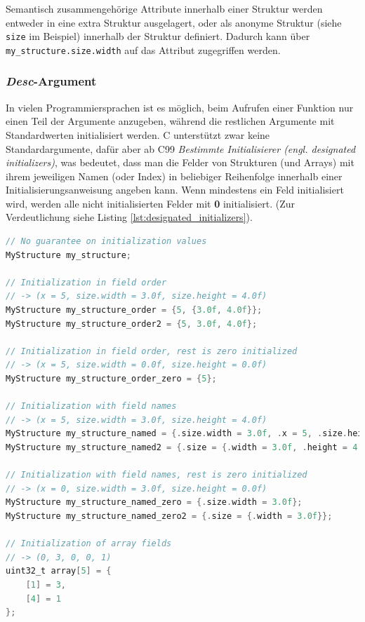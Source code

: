 \documentclass[oneside]{ausarbeitung}
\begin{document}
Semantisch zusammengehörige Attribute innerhalb einer Struktur werden entweder in eine extra Struktur ausgelagert, oder als anonyme Struktur (siehe \texttt{size} im Beispiel) innerhalb der Struktur definiert. Dadurch kann über \texttt{my\_structure.size.width} auf das Attribut zugegriffen werden.

\subsubsection{\textit{Desc}-Argument}
In vielen Programmiersprachen ist es möglich, beim Aufrufen einer Funktion nur einen Teil der Argumente anzugeben, während die restlichen Argumente mit Standardwerten initialisiert werden. C unterstützt zwar keine Standardargumente, dafür aber ab C99 \textit{Bestimmte Initialisierer (engl. designated initializers)}, was bedeutet, dass man die Felder von Strukturen (und Arrays) mit ihrem jeweiligen Namen (oder Index) in beliebiger Reihenfolge innerhalb einer Initialisierungsanweisung angeben kann. Wenn mindestens ein Feld initialisiert wird, werden alle nicht initialisierten Felder mit \textbf{0} initialisiert. (Zur Verdeutlichung siehe Listing \ref{lst:designated_initializers}). 

\begin{minipage}{\textwidth}
\begin{lstlisting}[language=C, label={lst:designated_initializers}, caption={Beispiele zu bestimmten Initialisierern (Unter Verwendung der in Listing \ref{lst:structs} definierten Struktur \textit{MyStructure})}]
// No guarantee on initialization values
MyStructure my_structure;

// Initialization in field order 
// -> (x = 5, size.width = 3.0f, size.height = 4.0f)
MyStructure my_structure_order = {5, {3.0f, 4.0f}};
MyStructure my_structure_order2 = {5, 3.0f, 4.0f};

// Initialization in field order, rest is zero initialized
// -> (x = 5, size.width = 0.0f, size.height = 0.0f)
MyStructure my_structure_order_zero = {5};

// Initialization with field names
// -> (x = 5, size.width = 3.0f, size.height = 4.0f)
MyStructure my_structure_named = {.size.width = 3.0f, .x = 5, .size.height = 4.0f};
MyStructure my_structure_named2 = {.size = {.width = 3.0f, .height = 4.0f }, .x = 5};

// Initialization with field names, rest is zero initialized
// -> (x = 0, size.width = 3.0f, size.height = 0.0f)
MyStructure my_structure_named_zero = {.size.width = 3.0f};
MyStructure my_structure_named_zero2 = {.size = {.width = 3.0f}};

// Initialization of array fields
// -> (0, 3, 0, 0, 1)
uint32_t array[5] = {
	[1] = 3,
	[4] = 1
};
\end{lstlisting}
\end{minipage}
\end{document}

